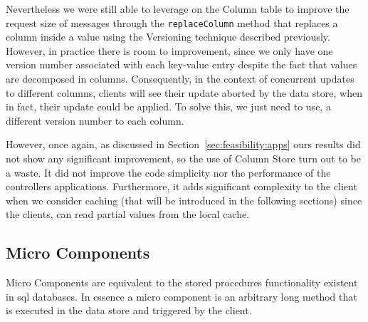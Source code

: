 Nevertheless we were still able to leverage on the Column table to improve the request size of messages through the \texttt{replaceColumn} method  that replaces a column inside a value using the Versioning technique described previously. 
However, in practice there is room to improvement, since we only have one version number associated with each key-value entry despite the fact that values are decomposed in columns. 
Consequently, in the context of concurrent updates to different columns, clients will see their update aborted by the data store, when in fact, their update could be applied. 
To solve this, we just need to use, a different version number to each column. 

However, once again,  as discussed in Section~\ref{sec:feasibility:apps} ours results did not show any significant improvement, so the use of Column Store turn out to be a waste. It did not improve  the code simplicity nor the performance of the controllers applications. 
Furthermore, it adds significant complexity to the client when we consider caching (that will be introduced in the following sections) since the clients, can read partial values from the local cache. 





\subsection{Micro Components}
\label{sec:heimdall:micro-components}
Micro Components are equivalent to the stored procedures functionality existent in \gls{sql} databases. 
In essence a micro component is an arbitrary long  method that is executed in the data store and triggered by the client. 

